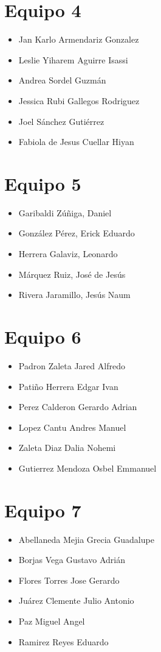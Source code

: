\documentclass[11pt, a4paper, oneside]{book}
\begin{document}
\section*{Equipo 4}
\begin{itemize}
    \item Jan Karlo Armendariz Gonzalez
    \item Leslie Yiharem Aguirre Isassi
    \item Andrea Sordel Guzmán
    \item Jessica Rubi Gallegos Rodriguez
    \item Joel Sánchez Gutiérrez
    \item Fabiola de Jesus Cuellar Hiyan
\end{itemize}

\section*{Equipo 5}
\begin{itemize}
    \item Garibaldi Zúñiga, Daniel
    \item González Pérez, Erick Eduardo
    \item Herrera Galaviz, Leonardo
    \item Márquez Ruiz, José de Jesús
    \item Rivera Jaramillo, Jesús Naum
\end{itemize}

\section*{Equipo 6}
\begin{itemize}
    \item Padron Zaleta Jared Alfredo
    \item Patiño Herrera Edgar Ivan
    \item Perez Calderon Gerardo Adrian
    \item Lopez Cantu Andres Manuel
    \item Zaleta Diaz Dalia Nohemi
    \item Gutierrez Mendoza Osbel Emmanuel
\end{itemize}
\section*{Equipo 7}
\begin{itemize}
    \item Abellaneda Mejia Grecia Guadalupe
    \item Borjas Vega Gustavo Adrián 
    \item Flores Torres Jose Gerardo 
    \item Juárez Clemente Julio Antonio 
    \item Paz Miguel Angel
    \item Ramirez Reyes Eduardo 
\end{itemize}
\end{document}
